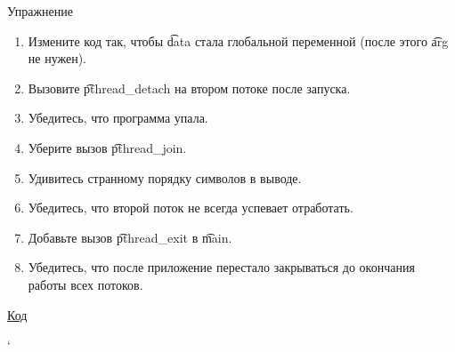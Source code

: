 \begin{frame}{Упражнение}
	\begin{enumerate}
		\item Измените код так, чтобы \t{data} стала глобальной переменной (после этого \t{arg} не нужен).
		\item Вызовите \t{pthread\_detach} на втором потоке после запуска.
		\item Убедитесь, что программа упала.
		\item Уберите вызов \t{pthread\_join}.
		\item Удивитесь странному порядку символов в выводе.
		\item Убедитесь, что второй поток не всегда успевает отработать.
		\item Добавьте вызов \t{pthread\_exit} в \t{main}.
		\item Убедитесь, что после приложение перестало закрываться до окончания работы всех потоков.
	\end{enumerate}
	\pause
	\href{https://github.com/yeputons/fall-2016-paradigms/raw/master/161019/sources/02-detached.c}{Код}
\end{frame}
`